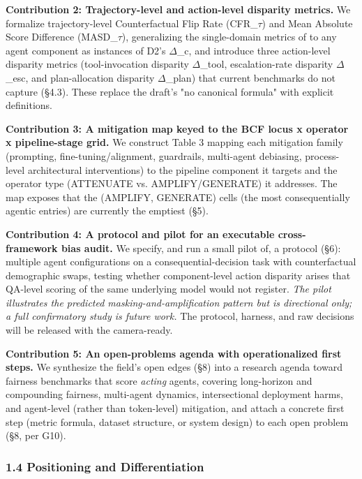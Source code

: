 \documentclass[10pt]{article}
\begin{document}
\textbf{Contribution 2: Trajectory-level and action-level disparity metrics.} We formalize trajectory-level Counterfactual Flip Rate (CFR\_$\tau$) and Mean Absolute Score Difference (MASD\_$\tau$), generalizing the single-domain metrics of \cite{mayilvaghanan2026counterfactual} to any agent component as instances of D2's $\Delta$\_c, and introduce three action-level disparity metrics (tool-invocation disparity $\Delta$\_tool, escalation-rate disparity $\Delta$\_esc, and plan-allocation disparity $\Delta$\_plan) that current benchmarks do not capture (\S{}4.3). These replace the draft's "no canonical formula" with explicit definitions.

\textbf{Contribution 3: A mitigation map keyed to the BCF locus x operator x pipeline-stage grid.} We construct Table 3 mapping each mitigation family (prompting, fine-tuning/alignment, guardrails, multi-agent debiasing, process-level architectural interventions) to the pipeline component it targets and the operator type (ATTENUATE vs. AMPLIFY/GENERATE) it addresses. The map exposes that the (AMPLIFY, GENERATE) cells (the most consequentially agentic entries) are currently the emptiest (\S{}5).

\textbf{Contribution 4: A protocol and pilot for an executable cross-framework bias audit.} We specify, and run a small pilot of, a protocol (\S{}6): multiple agent configurations on a consequential-decision task with counterfactual demographic swaps, testing whether component-level action disparity arises that QA-level scoring of the same underlying model would not register. \emph{The pilot illustrates the predicted masking-and-amplification pattern but is directional only; a full confirmatory study is future work.} The protocol, harness, and raw decisions will be released with the camera-ready.

\textbf{Contribution 5: An open-problems agenda with operationalized first steps.} We synthesize the field's open edges (\S{}8) into a research agenda toward fairness benchmarks that score \emph{acting} agents, covering long-horizon and compounding fairness, multi-agent dynamics, intersectional deployment harms, and agent-level (rather than token-level) mitigation, and attach a concrete first step (metric formula, dataset structure, or system design) to each open problem (\S{}8, per G10).

\subsubsection*{1.4 Positioning and Differentiation}
\end{document}
